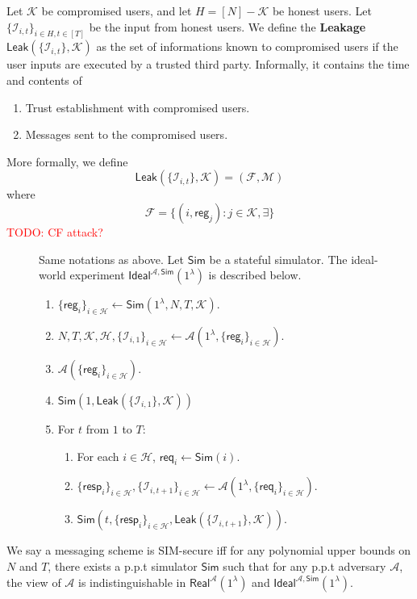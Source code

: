 \documentclass[sigconf, nonacm, balance=false, natbib=false, screen]{acmart}
\newcommand\todo[1]{\textcolor{red}{TODO: #1}}
\newcommand{\reg}{\mathsf{reg}}
\newcommand{\req}{\mathsf{req}}
\newcommand{\resp}{\mathsf{resp}}
\newcommand{\cK}{\mathcal{K}}
\newcommand{\Sim}{\mathsf{Sim}}
\newcommand{\cA}{\mathcal{A}}
\newcommand{\cI}{\mathcal{I}}
\newcommand{\cH}{\mathcal{H}}
\newcommand{\cF}{\mathcal{F}}
\newcommand{\cM}{\mathcal{M}}
\begin{document}
\begin{definition}[Leakage]
Let $\cK$ be compromised users, and let $H = [N] - \cK$ be honest users. Let $\{\cI_{i, t}\}_{i \in H, t \in [T]}$ be the input from honest users. We define the \textbf{Leakage} $\mathsf{Leak}(\{\cI_{i, t}\}, \cK)$ as the set of informations known to compromised users if the user inputs are executed by a trusted third party. Informally, it contains the time and contents of
\begin{enumerate}
    \item Trust establishment with compromised users.
    \item Messages sent to the compromised users.
\end{enumerate}
More formally, we define
$$\mathsf{Leak}(\{\cI_{i, t}\}, \cK) = (\cF, \cM)$$
where
$$\cF = \{(i, \reg_j): j \in \cK, \exists \}$$
\todo{CF attack?}
\end{definition}
\begin{figure}[h!]
\begin{framed}
\begin{definition}
Same notations as above. Let $\Sim$ be a stateful simulator. The ideal-world experiment $\mathsf{Ideal}^{\cA, \Sim}(1^{\lambda})$ is described below.
\begin{enumerate}
\item $\{\reg_i\}_{i \in \cH} \leftarrow \Sim(1^{\lambda}, N, T, \cK)$. 
\item $N, T, \cK, \cH, \{\cI_{i, 1}\}_{i \in \cH} \leftarrow \cA(1^{\lambda}, \{\reg_i\}_{i \in \cH})$.
\item $\cA(\{\reg_i\}_{i \in \cH})$.
\item $\Sim(1, \mathsf{Leak}(\{\cI_{i, 1}\}, \cK))$
\item For $t$ from $1$ to $T$:
    \begin{enumerate}
    \item For each $i \in \cH$, $\req_i \leftarrow \Sim(i)$.
    
    \item $\{\resp_i\}_{i \in \cH}, \{\cI_{i, t + 1}\}_{i \in \cH} \leftarrow \cA(1^{\lambda}, \{\req_i\}_{i \in \cH})$.
    
    \item $\Sim(t, \{\resp_i\}_{i \in \cH}, \mathsf{Leak}(\{\cI_{i, t + 1}\}, \cK))$.
    \end{enumerate}
\end{enumerate}
\end{definition}
\end{framed}
\end{figure}
\begin{definition}
We say a messaging scheme is SIM-secure iff for  any polynomial upper bounds on $N$ and $T$, there exists a p.p.t simulator $\Sim$ such that for any p.p.t adversary $\cA$, the view of $\cA$ is indistinguishable in $\mathsf{Real}^{\cA}(1^{\lambda})$ and $\mathsf{Ideal}^{\cA, \mathsf{\Sim}}(1^{\lambda})$.
\end{definition}
\end{document}

